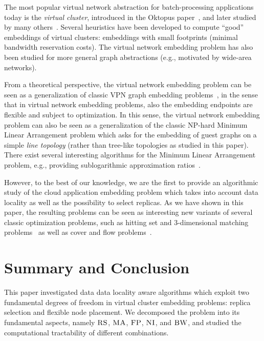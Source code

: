 \documentclass[9pt,twocolumn]{scrartcl}
\newcommand{\CC}{\textsc{NI}}
\newcommand{\FP}{\textsc{FP}}
\newcommand{\RS}{\textsc{RS}}
\newcommand{\BW}{\textsc{BW}}
\newcommand{\MA}{\textsc{MA}}
\begin{document}
The most popular virtual network abstraction for batch-processing applications today is the \emph{virtual cluster},
introduced in the Oktopus paper~\cite{oktopus}, and later studied by many others~\cite{talk-about,proteus}.
Several heuristics have been developed to compute ``good'' embeddings of virtual clusters: embeddings
with small footprints (minimal bandwidth reservation costs).\cite{oktopus,talk-about,proteus}
The virtual network embedding problem has also been studied for more general graph abstractions
(e.g., motivated by wide-area networks).~\cite{infocom2009,ammar,turner,simannealing,ucc12mip,zhu06}

From a theoretical perspective, the virtual network embedding problem can be seen as a generalization
of classic VPN graph embedding problems~\cite{Goyal2008,gupta2001provisioning},
in the sense that in virtual network embedding problems, also the embedding endpoints are flexible and subject to optimization.
In this sense, the virtual network embedding problem can also be seen as a generalization of the
classic NP-hard Minimum Linear Arrangement problem which asks for the
embedding of guest graphs on a simple \emph{line topology} (rather than tree-like topologies as
studied in this paper).~\cite{mla,mla-survey}
There exist several interesting algorithms for the Minimum Linear Arrangement problem,
e.g., providing sublogarithmic approximation ratios~\cite{mla-feige}.

However, to the best of our knowledge, we are the first to provide an algorithmic
study of the cloud application embedding problem which takes into account
data locality as well as the possibility to select replicas. As we have shown in this paper,
the resulting problems can be seen as interesting new variants of several classic optimization
problems, such as hitting set and 3-dimensional matching problems~\cite{3SC-hard} as well as cover and flow problems~\cite{korte2002combinatorial}.

\section{Summary and Conclusion}\label{sec:conclusion}

This paper investigated data data locality aware algorithms which exploit two fundamental
degrees of freedom in virtual cluster
embedding problems: replica selection and flexible node placement. We
decomposed the problem into its fundamental aspects,
namely $\RS$, $\MA$, $\FP$, $\CC$, and $\BW$, and studied the computational
tractability of different combinations.
\end{document}
